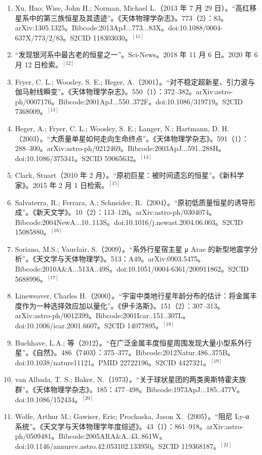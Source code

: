 \begin{enumerate}
\item Xu, Hao; Wise, John H.; Norman, Michael L.（2013 年 7 月 29 日）。“高红移星系中的第三族恒星及其遗迹”。《天体物理学杂志》。773（2）：83。arXiv:1305.1325。Bibcode:2013ApJ...773...83X。doi:10.1088/0004-637X/773/2/83。S2CID 118303030。$^{[11]}$
\item “发现银河系中最古老的恒星之一”。Sci-News。2018 年 11 月 6 日。2020 年 6 月 12 日检索。$^{[12]}$
\item Fryer, C. L.; Woosley, S. E.; Heger, A.（2001）。“对不稳定超新星、引力波与伽马射线瞬变”。《天体物理学杂志》。550（1）：372–382。arXiv:astro-ph/0007176。Bibcode:2001ApJ...550..372F。doi:10.1086/319719。S2CID 7368009。$^{[13]}$
\item Heger, A.; Fryer, C. L.; Woosley, S. E.; Langer, N.; Hartmann, D. H.（2003）。“大质量单星如何走向生命终点”。《天体物理学杂志》。591（1）：288–300。arXiv:astro-ph/0212469。Bibcode:2003ApJ...591..288H。doi:10.1086/375341。S2CID 59065632。$^{[14]}$
\item Clark, Stuart（2010 年 2 月）。“原初巨星：被时间遗忘的恒星”。《新科学家》。2015 年 2 月 1 日检索。$^{[15]}$
\item Salvaterra, R.; Ferrara, A.; Schneider, R.（2004）。“原初低质量恒星的诱导形成”。《新天文学》。10（2）：113–120。arXiv:astro-ph/0304074。Bibcode:2004NewA...10..113S。doi:10.1016/j.newast.2004.06.003。S2CID 15085880。$^{[16]}$
\item Soriano, M.S.; Vauclair, S.（2009）。“系外行星宿主星 μ Arae 的新型地震学分析”。《天文学与天体物理学》。513：A49。arXiv:0903.5475。Bibcode:2010A&A...513A..49S。doi:10.1051/0004-6361/200911862。S2CID 5688996。$^{[17]}$
\item Lineweaver, Charles H.（2000）。“宇宙中类地行星年龄分布的估计：将金属丰度作为一种选择效应加以量化”。《伊卡洛斯》。151（2）：307–313。arXiv:astro-ph/0012399。Bibcode:2001Icar..151..307L。doi:10.1006/icar.2001.6607。S2CID 14077895。$^{[18]}$
\item Buchhave, L.A.; 等（2012）。“在广泛金属丰度恒星周围发现大量小型系外行星”。《自然》。486（7403）：375–377。Bibcode:2012Natur.486..375B。doi:10.1038/nature11121。PMID 22722196。S2CID 4427321。$^{[19]}$
\item van Albada, T. S.; Baker, N.（1973）。“关于球状星团的两类奥斯特霍夫族群”。《天体物理学杂志》。185：477–498。Bibcode:1973ApJ...185..477V。doi:10.1086/152434。$^{[20]}$
\item Wolfe, Arthur M.; Gawiser, Eric; Prochaska, Jason X.（2005）。“阻尼 Ly-α 系统”。《天文学与天体物理学年度综述》。43（1）：861–918。arXiv:astro-ph/0509481。Bibcode:2005ARA&A..43..861W。doi:10.1146/annurev.astro.42.053102.133950。S2CID 119368187。$^{[21]}$

\end{enumerate}
